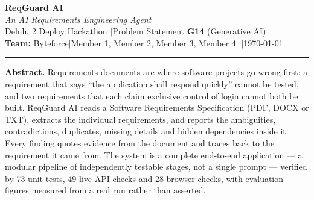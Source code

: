 \pagestyle{fancy}
\fancyhf{}
\fancyhead[R]{\footnotesize \thepage}
\renewcommand{\headrulewidth}{0.4pt}

\lstset{style=code}

\newcommand{\TeamName}{Byteforce}
\newcommand{\TeamMembers}{Member 1, Member 2, Member 3, Member 4}
\newcommand{\CollegeName}{[Your College / Institution]}



\begin{center}
  {\LARGE\bfseries\color{primary} ReqGuard AI}\\[2pt]
  {\large\itshape An AI Requirements Engineering Agent}\\[4pt]
  {\footnotesize Delulu 2 Deploy Hackathon \quad$\vert$\quad Problem Statement
   \textbf{G14} (Generative AI)}\\[4pt]
  {\footnotesize \textbf{Team:} \TeamName \quad$\vert$\quad \TeamMembers
   \quad$\vert$\quad \CollegeName \quad$\vert$\quad \today}
\end{center}
\vspace{2pt}
\hrule
\vspace{6pt}

\begin{center}
\begin{minipage}{0.93\textwidth}
{\small\textbf{Abstract.} Requirements documents are where software projects go
wrong first: a requirement that says ``the application shall respond quickly''
cannot be tested, and two requirements that each claim exclusive control of
login cannot both be built. ReqGuard AI reads a Software Requirements
Specification (PDF, DOCX or TXT), extracts the individual requirements, and
reports the ambiguities, contradictions, duplicates, missing details and hidden
dependencies inside it. Every finding quotes evidence from the document and
traces back to the requirement it came from. The system is a complete
end-to-end application --- a modular pipeline of independently testable stages,
not a single prompt --- verified by 73 unit tests, 49 live API checks and 28
browser checks, with evaluation figures measured from a real run rather than
asserted.}
\end{minipage}
\end{center}
\vspace{4pt}

